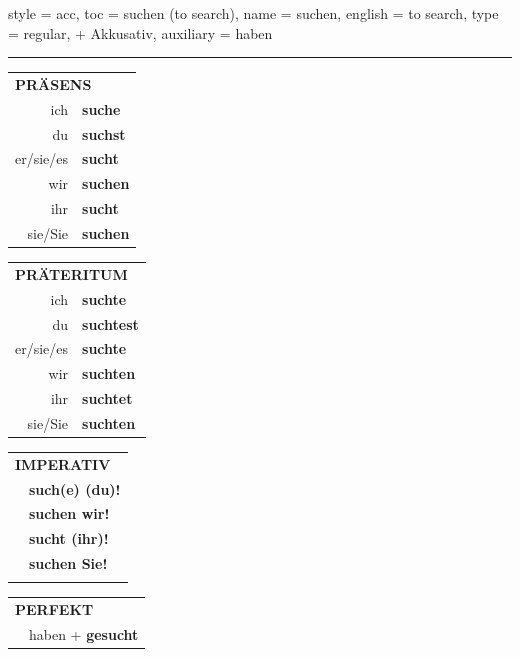 \begin{verbentry}{
  style = {acc},
  toc = {suchen (to search)},
  name = {suchen},
  english = {to search},
  type = {regular, + Akkusativ},
  auxiliary = {haben}
}
 
    
     \vspace{5pt}

    \hrule
    
    \vspace{5pt}

  \begin{tabular}{rl}
     \multicolumn{2}{l}{\textbf{PRÄSENS} }\\
    ich & \textbf{suche}\\
    du & \textbf{suchst}\\
    er/sie/es & \textbf{sucht}\\
    wir & \textbf{suchen}\\
    ihr & \textbf{sucht}\\
    sie/Sie & \textbf{suchen}\\
  \end{tabular}
  \hfill
     \begin{tabular}{rl}
    \multicolumn{2}{l}{\textbf{PRÄTERITUM} }\\
    ich & \textbf{suchte}\\
    du & \textbf{suchtest}\\
    er/sie/es & \textbf{suchte}\\
    wir & \textbf{suchten}\\
    ihr & \textbf{suchtet}\\
    sie/Sie & \textbf{suchten}\\
  \end{tabular}
  \hfill
  \begin{tabular}{rl}
     \multicolumn{2}{l}{\textbf{IMPERATIV} }\\
   & \textbf{such(e) (du)!}\\
   & \textbf{suchen wir!}\\
   & \textbf{sucht (ihr)!}\\
   & \textbf{suchen Sie!}\\
   & \vspace{10pt}
  \end{tabular}

    \vspace{10pt}

 \begin{tabular}{rl}
     \multicolumn{2}{l}{\textbf{PERFEKT}}\\
   & haben + \textbf{gesucht}\\
  \end{tabular}
\hfill
   \begin{tabular}{rl}
   

\end{tabular}
\end{verbentry}
